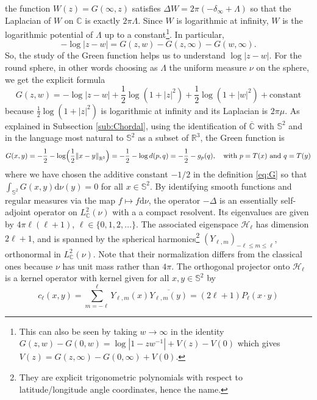 \documentclass[10pt,reqno]{amsart}
\numberwithin{equation}{section}
\numberwithin{figure}{section}
\theoremstyle{plain}
\newcommand{\<}{\langle}
\renewcommand{\>}{\rangle}
\begin{document}
the function $W(z) = G(\infty,z)$ satisfies
$\Delta W = 2\pi(-\delta_{\infty} + \Lambda)$
so that
the Laplacian of $W$ on
$\mathbb C$ is exactly $2\pi \Lambda$.
Since $W$ is logarithmic at infinity,
$W$ is the logarithmic potential of $\Lambda$ up
to a constant\footnote{This can also be
seen by taking $w \to \infty$ in the identity
$G(z,w) - G(0,w) = \log|1-z w^{-1}| 
+ V(z) - V(0)$ which gives
$V(z) = G(z,\infty) - G(0,\infty) +V(0)$.}.
In particular,
\[- \log |z-w| = G(z,w) - G(z,\infty)
- G(w,\infty).\]
So, the study of the Green function helps
us to understand 
$\log|z-w|$. For 
the round sphere,
in other words choosing as $\Lambda$
the uniform measure $\nu$ on the sphere, 
we get the explicit formula
\[G(z,w) = - \log|z-w| + 
\frac{1}{2}\log (1 + |z|^2)
+\frac{1}{2}\log (1 + |w|^2) + \mathrm{constant}\]
because 
$\frac{1}{2}\log (1 + |z|^2)$ is logarithmic at
infinity and its Laplacian is $2\pi\mu$.
As explained in Subsection \ref{sub:Chordal},
using the identification
of $\overline{\mathbb C}$ with $\mathbb{S}^2$ and in the language most natural to 
$\mathbb{S}^2$ as a subset of $\mathbb R^3$,
the Green function is
\begin{equation}\label{eq:G}
  G(x,y)=-\frac{1}{2}-\log\Bigl(\frac{1}{2}{\|x-y\|}_{\mathbb{R}^3}\Bigr)=
  -\frac{1}{2}-\log d(p,q)
  = - \frac{1}{2} - g_p(q),
  \quad \text{with } p = T(x) \text{ and } q = T(y)
\end{equation}
where 
we have chosen the additive constant $-1/2$ in the definition \eqref{eq:G} so that
$\int_{\mathbb{S}^2}G(x,y)\mathrm{d}\nu(y)=0$ for all $x\in\mathbb{S}^2$.
By identifying smooth functions and regular measures
via the map $f \mapsto f \mathrm d \nu$,
the operator $-\Delta$ 
is an essentially self-adjoint operator
on $L^2_{\mathbb{C}}(\nu)$ with a 
a compact resolvent. Its
eigenvalues are given by $4\pi \ell(\ell+1)$, $\ell\in\{0,1,2,\ldots\}$. The
associated eigenspace $\mathcal{H}_\ell$ has dimension $2\ell+1$, and is
spanned by the spherical harmonics\footnote{They are explicit
  trigonometric polynomials with respect to latitude/longitude angle coordinates, hence the name.} ${(Y_{\ell,m})}_{-\ell\leq m\leq\ell}$, orthonormal in $L^2_{\mathbb{C}}(\nu)$. Note that their normalization
  differs from the classical ones
  because $\nu$ has unit mass rather than $4\pi$. The
orthogonal projector onto $\mathcal{H}_\ell$ is a kernel
operator with kernel given for all $x,y\in\mathbb{S}^2$ by
\begin{equation}\label{eq:addition-identity}
  c_\ell(x,y)
  =\sum_{m=-\ell}^{\ell}Y_{\ell,m}(x)\overline{Y_{\ell,m}(y)}
  =(2\ell+1)P_\ell(x\cdot y)
\end{equation}
\end{document}
